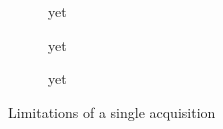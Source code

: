\begin{figure}
\begin{subfigure}[t]{0.3\textwidth}
\begin{tikzpicture}
    
        \end{tikzpicture}

        \caption{yet}
    \end{subfigure}
    \begin{subfigure}[t]{0.3\textwidth}
        \centering

        \caption{yet}
    \end{subfigure}
    \begin{subfigure}[t]{0.3\textwidth}
        \centering

        \caption{yet}
    \end{subfigure}

    \caption{Limitations of a single acquisition}

\end{figure}